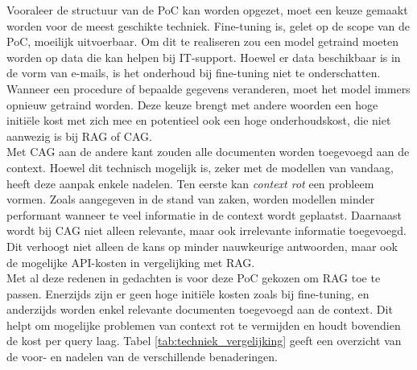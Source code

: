 Vooraleer de structuur van de PoC kan worden opgezet, moet een keuze gemaakt worden voor de meest geschikte techniek. Fine-tuning is, gelet op de scope van de PoC, moeilijk uitvoerbaar. Om dit te realiseren zou een model getraind moeten worden op data die kan helpen bij IT-support. Hoewel er data beschikbaar is in de vorm van e-mails, is het onderhoud bij fine-tuning niet te onderschatten. Wanneer een procedure of bepaalde gegevens veranderen, moet het model immers opnieuw getraind worden. Deze keuze brengt met andere woorden een hoge initiële kost met zich mee en potentieel ook een hoge onderhoudskost, die niet aanwezig is bij RAG of CAG.
\\[1em]
Met CAG aan de andere kant zouden alle documenten worden toegevoegd aan de context. Hoewel dit technisch mogelijk is, zeker met de modellen van vandaag, heeft deze aanpak enkele nadelen. Ten eerste kan \textit{context rot} een probleem vormen. Zoals aangegeven in de stand van zaken, worden modellen minder performant wanneer te veel informatie in de context wordt geplaatst. Daarnaast wordt bij CAG niet alleen relevante, maar ook irrelevante informatie toegevoegd. Dit verhoogt niet alleen de kans op minder nauwkeurige antwoorden, maar ook de mogelijke API-kosten in vergelijking met RAG.
\\[1em]
Met al deze redenen in gedachten is voor deze PoC gekozen om RAG toe te passen. Enerzijds zijn er geen hoge initiële kosten zoals bij fine-tuning, en anderzijds worden enkel relevante documenten toegevoegd aan de context. Dit helpt om mogelijke problemen van context rot te vermijden en houdt bovendien de kost per query laag. Tabel \ref{tab:techniek_vergelijking} geeft een overzicht van de voor- en nadelen van de verschillende benaderingen.

\begin{table}[H]
    \caption{Vergelijking van voor- en nadelen van fine-tuning, CAG en RAG}
    \label{tab:techniek_vergelijking}
\end{table}

